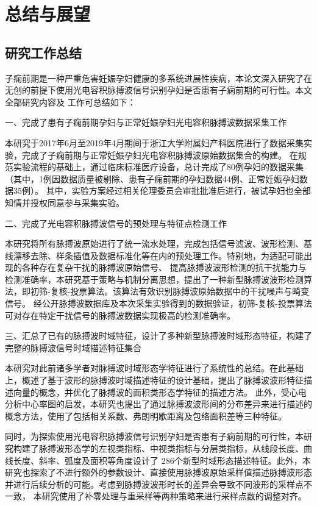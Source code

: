 \chapter{总结与展望}
\section{研究工作总结}
子痫前期是一种严重危害妊娠孕妇健康的多系统进展性疾病，本论文深入研究了在无创的前提下使用光电容积脉搏波信号识别孕妇是否患有子痫前期的可行性。本文全部研究内容及
工作可总结如下：

一、完成了患有子痫前期孕妇与正常妊娠孕妇光电容积脉搏波数据采集工作

本研究于2017年6月至2019年4月期间于浙江大学附属妇产科医院进行了数据采集实验，完成了子痫前期与正常妊娠孕妇光电容积脉搏波原始数据集合的构建。
在规范实验流程的基础上，通过临床标准医疗设备，总计完成了80例孕妇的数据采集（其中，1例因数据质量被剔除、患有子痫前期的孕妇数据44例、正常妊娠孕妇数据35例）。
其中，实验方案经过相关伦理委员会审批批准后进行，被试孕妇也全部知情并授权同意参与采集实验。

二、完成了光电容积脉搏波信号的预处理与特征点检测工作

本研究将所有脉搏波原始进行了统一流水处理，完成包括信号滤波、波形检测、基线漂移去除、样条插值及数据标准化等在内的预处理工作。特别地，为适配可能出现的各种存在复杂干扰的脉搏波原始信号、
提高脉搏波波形检测的抗干扰能力与检测准确率，本研究基于策略与机制分离思想，提出了一种新型脉搏波波形检测算法，即初筛-复核-投票算法。该算法有效识别脉搏波原始数据中的干扰噪声与畸变信号。
经公开脉搏波数据库及本次采集实验得到的数据验证，初筛-复核-投票算法可对存在特定干扰信号的脉搏波数据实现极高的检测准确率。

三、汇总了已有的脉搏波时域特征，设计了多种新型脉搏波时域形态特征，构建了完整的脉搏波信号时域描述特征集合

本研究对此前诸多学者对脉搏波时域形态学特征进行了系统性的总结。在此基础上，概述了基于波形的脉搏波时域描述特征的设计基础，提出了脉搏波波形特征描述向量的概念，并优化了脉搏波的面积类形态学特征的描述方法。
此外，受心电分析中心率图的启发，本研究也提出了通过脉搏波波形间的分布差异来进行描述的概念方法，使用了包括相关系数、弗朗明歇距离及包络面积差等三种特征。

同时，为探索使用光电容积脉搏波信号识别孕妇是否患有子痫前期的可行性，本研究构建了脉搏波形态学的左视类指标、中视类指标与分层类指标，从线段长度、曲线长度、斜率、弧度及面积等角度设计了
286个新型时域形态描述特征。此外，本研究也探索了不进行额外的参数设计、直接使用脉搏波原始采样值描述脉搏波形态并进行后续分析的可能。考虑到脉搏波波形时长的差异会导致不同波形的采样点不一致，
本研究使用了补零处理与重采样等两种策略来进行采样点数的调整对齐。

